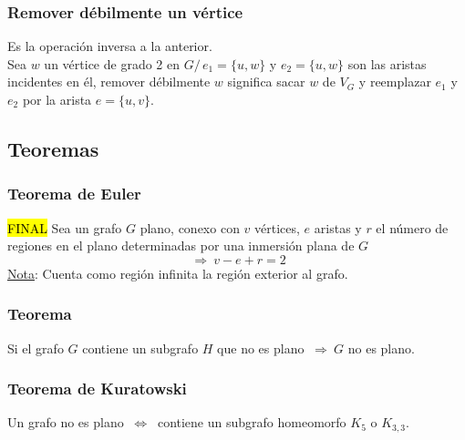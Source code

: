 \documentclass{article}
\newcommand{\tq}{/\,}                                   %
\newcommand{\Rightarrows}{\: \Rightarrow \:}            %
\newcommand{\Leftrightarrows}{\: \Leftrightarrow \:}    %
\begin{document}
\subsubsection*{Remover débilmente un vértice}
Es la operación inversa a la anterior.
\\Sea $w$ un vértice de grado 2 en $G \tq e_1 = \{u,w\}$ y $e_2 = \{u,w\}$ son las aristas incidentes en él, 
remover débilmente $w$ significa sacar $w$ de $V_G$ y reemplazar $e_1$ y $e_2$ por la arista $e=\{u,v\}$.

\subsection{Teoremas}
\subsubsection{Teorema de Euler} \hl{FINAL}
Sea un grafo $G$ plano, conexo con $v$ vértices, $e$ aristas y $r$ el número de
regiones en el plano determinadas por una inmersión plana de $G$
\begin{equation*}
    \Rightarrows v - e + r = 2
\end{equation*}
\underline{Nota}: Cuenta como región infinita la región exterior al grafo.

\subsubsection{Teorema}
Si el grafo $G$ contiene un subgrafo $H$ que no es plano $\Rightarrows G$ no es plano.

\subsubsection{Teorema de Kuratowski}
Un grafo no es plano $\Leftrightarrows$ contiene un subgrafo homeomorfo $K_5$ o $K_{3,3}$.

\end{document}
